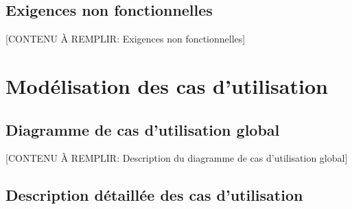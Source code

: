 \subsection{Exigences non fonctionnelles}


[CONTENU À REMPLIR: Exigences non fonctionnelles]


\section{Modélisation des cas d'utilisation}


\subsection{Diagramme de cas d'utilisation global}


[CONTENU À REMPLIR: Description du diagramme de cas d'utilisation global]


\subsection{Description détaillée des cas d'utilisation}


